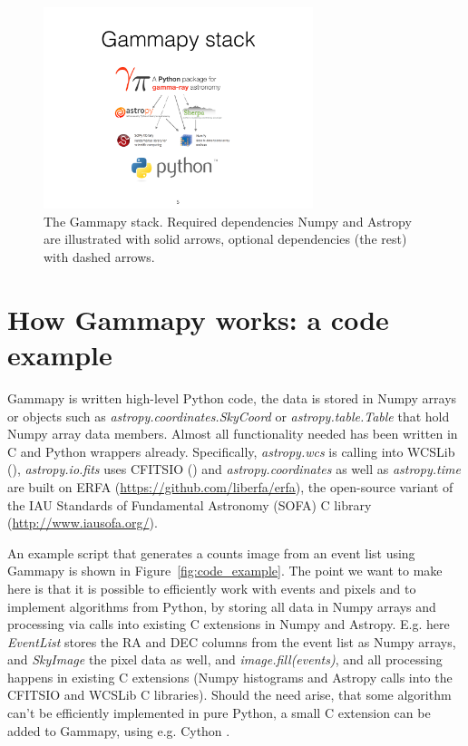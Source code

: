\documentclass{PoS}
\newcommand{\url}[1]{\href{#1}{#1}}
\begin{document}
\begin{figure}[t]
\centering
\includegraphics[width=0.7\textwidth]{figures/gammapy-stack}
\caption{
The Gammapy stack. Required dependencies Numpy and Astropy are illustrated with solid arrows, optional dependencies (the rest) with dashed arrows.
}
\label{fig:stack}
\end{figure}

\section{How Gammapy works: a code example}
\label{sec:code}

Gammapy is written high-level Python code, the data is stored in Numpy arrays or
objects such as {\it astropy.coordinates.SkyCoord} or {\it astropy.table.Table}
that hold Numpy array data members. Almost all functionality needed has been
written in C and Python wrappers already. Specifically, {\it astropy.wcs} is
calling into WCSLib (\cite{wcslib}), {\it astropy.io.fits} uses CFITSIO
(\cite{cfitsio}) and {\it astropy.coordinates} as well as {\it astropy.time} are
built on ERFA (\url{https://github.com/liberfa/erfa}), the open-source variant
of the IAU Standards of Fundamental Astronomy (SOFA) C library\linebreak
(\url{http://www.iausofa.org/}).

An example script that generates a counts image from an event list using Gammapy
is shown in Figure~\ref{fig:code_example}. The point we want to
make here is that it is possible to efficiently work with events and pixels and
to implement algorithms from Python, by storing all data in Numpy arrays and
processing via calls into existing C extensions in Numpy and Astropy. E.g. here
{\it EventList} stores the RA and DEC columns from the event list as Numpy
arrays, and {\it SkyImage} the pixel data as well, and {\it image.fill(events)},
and all processing happens in existing C extensions (Numpy histograms and
Astropy calls into the CFITSIO and WCSLib C libraries). Should the need arise,
that some algorithm can't be efficiently implemented in pure Python, a small C
extension can be added to Gammapy, using e.g. Cython \cite{cython}.
\end{document}
